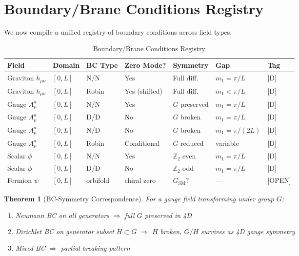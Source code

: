 \documentclass[11pt,a4paper]{article}
\newtheorem{theorem}{Theorem}[section]
\begin{document}
\section{Boundary/Brane Conditions Registry}
\label{sec:bc-registry}

We now compile a unified registry of boundary conditions across field types.

\begin{table}[h]
\centering
\caption{Boundary/Brane Conditions Registry}
\label{tab:bc-registry}
\small
\begin{tabular}{lllllll}
\toprule
Field & Domain & BC Type & Zero Mode? & Symmetry & Gap & Tag \\
\midrule
Graviton $h_{\mu\nu}$ & $[0,L]$ & N/N & Yes & Full diff. & $m_1 = \pi/L$ & [D] \\
Graviton $h_{\mu\nu}$ & $[0,L]$ & Robin & Yes (shifted) & Full diff. & $m_1 < \pi/L$ & [D] \\
\midrule
Gauge $A_\mu^a$ & $[0,L]$ & N/N & Yes & $G$ preserved & $m_1 = \pi/L$ & [D] \\
Gauge $A_\mu^a$ & $[0,L]$ & D/D & No & $G$ broken & $m_1 = \pi/L$ & [D] \\
Gauge $A_\mu^a$ & $[0,L]$ & N/D & No & $G$ broken & $m_1 = \pi/(2L)$ & [D] \\
Gauge $A_\mu^a$ & $[0,L]$ & Robin & Conditional & $G$ reduced & variable & [D] \\
\midrule
Scalar $\phi$ & $[0,L]$ & N/N & Yes & $\mathbb{Z}_2$ even & $m_1 = \pi/L$ & [D] \\
Scalar $\phi$ & $[0,L]$ & D/D & No & $\mathbb{Z}_2$ odd & $m_1 = \pi/L$ & [D] \\
\midrule
Fermion $\psi$ & $[0,L]$ & orbifold & chiral zero & $G_{\text{SM}}$? & — & [OPEN] \\
\bottomrule
\end{tabular}
\end{table}

\begin{theorem}[BC-Symmetry Correspondence]
\label{thm:bc-symmetry}
For a gauge field transforming under group $G$:
\begin{enumerate}
  \item Neumann BC on all generators $\Rightarrow$ full $G$ preserved in 4D
  \item Dirichlet BC on generator subset $H \subset G$ $\Rightarrow$ $H$ broken,
        $G/H$ survives as 4D gauge symmetry
  \item Mixed BC $\Rightarrow$ partial breaking pattern
\end{enumerate}
\end{theorem}
\end{document}
